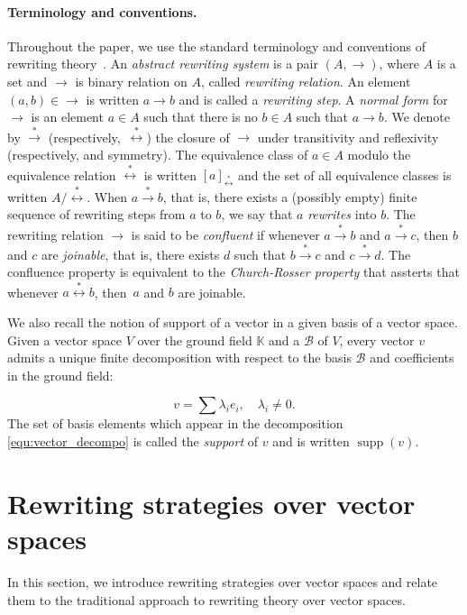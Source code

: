 \documentclass[11pt]{article}
\theoremstyle{definition}
\newcommand\basis{\mathscr{B}}
\DeclareMathOperator{\supp}{supp}
\newcommand\K{\mathbb{K}}
\newcommand\transRew{\overset{*}{\to}}
\newcommand\rewEquiv{\overset{*}{\leftrightarrow}}
\begin{document}
\paragraph{Terminology and conventions.}

Throughout the paper, we use the standard terminology and conventions of
rewriting theory~\cite{MR1629216}. An {\em abstract rewriting system} is
a pair $(A,\to)$, where $A$ is a set and $\to$ is binary relation on $A$,
called {\em rewriting relation}. An element~$(a,b)\in\to$ is written
$a\to b$ and is called a {\em rewriting step}. A {\em normal form} for
$\to$ is an element $a\in A$ such that there is no $b\in A$ such that
$a\to b$. We denote by $\transRew$  (respectively,~$\rewEquiv$) the
closure of $\to$ under transitivity and reflexivity (respectively, and
symmetry). The equivalence class of $a\in A$ modulo the equivalence
relation $\rewEquiv$ is written $[a]_{\rewEquiv}$ and the set of all
equivalence classes is written $A/\rewEquiv$. When $a\transRew b$, that
is, there exists a (possibly empty) finite sequence of rewriting steps
from $a$ to  $b$, we say that $a$ {\em rewrites} into $b$. The rewriting
relation $\to$ is said to be {\em confluent} if whenever $a\transRew b$
and $a\transRew c$, then $b$ and $c$ are {\em joinable}, that is, there
exists $d$ such that $b\transRew c$ and $c\transRew d$. The confluence
property is equivalent to the {\em Church-Rosser property} that assterts
that whenever $a\rewEquiv b$, then~$a$ and $b$ are joinable.
\medskip

We also recall the notion of support of a vector in a given basis of a
vector space. Given a vector space $V$ over the ground field $\K$ and a
$\basis$ of $V$, every vector $v$ admits a unique finite decomposition
with respect to the basis $\basis$ and coefficients in the ground field:

\begin{equation}\label{equ:vector_decompo}
  v=\sum\lambda_ie_i,\quad\lambda_i\neq 0.
\end{equation}
The set of basis elements which appear in the decomposition
\eqref{equ:vector_decompo} is called the {\it support} of $v$ and is
written $\supp(v)$. 


\section{Rewriting strategies over vector spaces}
\label{sec:rewriting_strategies_over_vector_space}

In this section, we introduce rewriting strategies over vector spaces and
relate them to the traditional approach to rewriting theory over vector
spaces. 
\medskip
\end{document}
